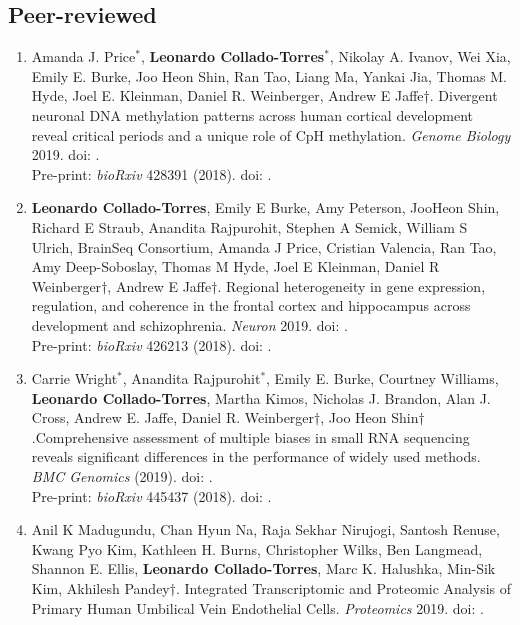 \subsection{Peer-reviewed}
    \begin{enumerate}
        \item Amanda J. Price$^{*}$, \textbf{Leonardo Collado-Torres}$^{*}$, Nikolay A. Ivanov, Wei Xia, Emily E. Burke, Joo Heon Shin, Ran Tao, Liang Ma, Yankai Jia, Thomas M. Hyde, Joel E. Kleinman, Daniel R. Weinberger, Andrew E Jaffe$\dagger$. Divergent neuronal DNA methylation patterns across human cortical development reveal critical periods and a unique role of CpH methylation. \emph{Genome Biology} 2019. doi: .
        \\ Pre-print: \emph{bioRxiv} 428391 (2018). doi: .
        
        \item \textbf{Leonardo Collado-Torres}, Emily E Burke, Amy Peterson, JooHeon Shin, Richard E Straub, Anandita Rajpurohit, Stephen A Semick, William S Ulrich, BrainSeq Consortium, Amanda J Price, Cristian Valencia, Ran Tao, Amy Deep-Soboslay, Thomas M Hyde, Joel E Kleinman, Daniel R Weinberger$\dagger$, Andrew E Jaffe$\dagger$. Regional heterogeneity in gene expression, regulation, and coherence in the frontal cortex and hippocampus across development and schizophrenia. \emph{Neuron} 2019. doi: .
        \\ Pre-print: \emph{bioRxiv} 426213 (2018). doi: .
        
        \item Carrie Wright$^{*}$, Anandita Rajpurohit$^{*}$, Emily E. Burke, Courtney Williams, \textbf{Leonardo Collado-Torres}, Martha Kimos, Nicholas J. Brandon, Alan J. Cross, Andrew E. Jaffe, Daniel R. Weinberger$\dagger$, Joo Heon Shin$\dagger$.Comprehensive assessment of multiple biases in small RNA sequencing reveals significant differences in the performance of widely used methods. \emph{BMC Genomics} (2019). doi: .
        \\ Pre-print: \emph{bioRxiv} 445437 (2018). doi: .
        
        \item Anil K Madugundu, Chan Hyun Na, Raja Sekhar Nirujogi, Santosh Renuse, Kwang Pyo Kim, Kathleen H. Burns, Christopher Wilks, Ben Langmead, Shannon E. Ellis, \textbf{Leonardo Collado-Torres}, Marc K. Halushka, Min-Sik Kim, Akhilesh Pandey$\dagger$. Integrated Transcriptomic and Proteomic Analysis of Primary Human Umbilical Vein Endothelial Cells. \emph{Proteomics} 2019. doi: .
        

\end{enumerate}
